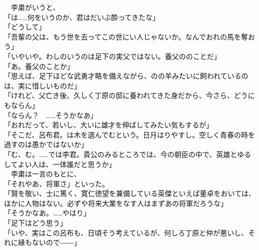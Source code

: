 \documentclass[
  paper=a5,
  fontsize=10pt,
  jafontsize=9.5pt,
  tate,                  %
  open_bracket_pos=nibu, %
]{jlreq}
\begin{document}
　李粛がいうと、\\


「は……何をいうのか、君はだいぶ酔ってきたな」\\


「どうして」\\


「吾輩の父は、もう世を去ってこの世にい人じゃないか。なんでおれの馬を奪おう」\\


「いやいや。わしのいうのは足下の実父ではない。養父ののことだ」\\


「あ。養父のことか」\\


「思えば、足下ほどな武勇才略を備えながら、のの羊みたいに飼われているのは、実に惜しいものだ」\\


「けれど、父亡き後、久しく丁原の邸に養われてきた身だから、今さら、どうにもならん」\\


「ならん？　……そうかなあ」\\


「おれだって、若いし、大いに雄才を伸ばしてみたい気もするが」\\


「そこだ、呂布君。は木を選んでむという。日月はりやすし。空しく青春の時を過すのは愚かではないか」\\


「む、む。……では李君。貴公のみるところでは、今の朝臣の中で、英雄とゆるしてよい人は、一体誰だと思うか」\\


　李粛は一言のもとに、\\


「それやあ、将軍さ」といった。\\


「賢を敬い、士に篤く、寛仁徳望を兼備している英傑といえば董卓をおいては、ほかに人物はない。必ずや将来大業をなす人はまずあの将軍だろうな」\\


「そうかなあ。……やはり」\\


「足下はどう思う」\\


「いや、実はこの呂布も、日頃そう考えているが、何しろ丁原と仲が悪いし、それに縁もないので――」\\
\end{document}

